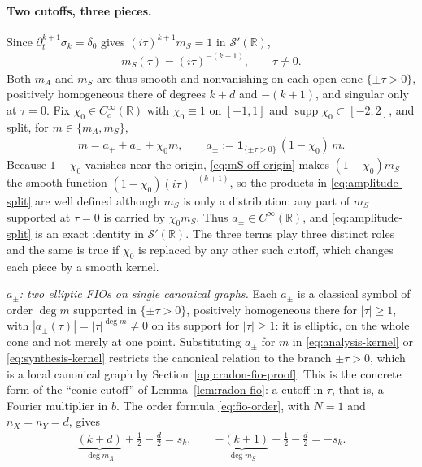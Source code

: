 \documentclass[12pt]{article}
\numberwithin{equation}{section}
\numberwithin{figure}{section}
\numberwithin{equation}{section}
\newcommand{\R}{\mathbb{R}}
\newcommand{\abs}[1]{\left|#1\right|}
\DeclareMathOperator{\supp}{supp}
\begin{document}
\paragraph{Two cutoffs, three pieces.}
Since $\partial_t^{k+1}\sigma_k=\delta_0$ gives $(i\tau)^{k+1}m_S=1$ in
$\mathcal S'(\R)$,
\begin{align}
    m_S(\tau)=(i\tau)^{-(k+1)},
    \qquad \tau\neq0 .
    \label{eq:mS-off-origin}
\end{align}
Both $m_A$ and $m_S$ are thus smooth and nonvanishing on each open cone
$\{\pm\tau>0\}$, positively homogeneous there of degrees $k+d$ and $-(k+1)$, and
singular only at $\tau=0$.  Fix $\chi_0\in C_c^\infty(\R)$ with $\chi_0\equiv1$ on
$[-1,1]$ and $\supp\chi_0\subset[-2,2]$, and split, for $m\in\{m_A,m_S\}$,
\begin{align}
    m=a_++a_-+\chi_0m,
    \qquad
    a_\pm:=\mathbf 1_{\{\pm\tau>0\}}\,(1-\chi_0)\,m .
    \label{eq:amplitude-split}
\end{align}
Because $1-\chi_0$ vanishes near the origin, \eqref{eq:mS-off-origin} makes
$(1-\chi_0)m_S$ the smooth function $(1-\chi_0)(i\tau)^{-(k+1)}$, so the products in
\eqref{eq:amplitude-split} are well defined although $m_S$ is only a distribution: any
part of $m_S$ supported at $\tau=0$ is carried by $\chi_0m_S$.  Thus
$a_\pm\in C^\infty(\R)$, and \eqref{eq:amplitude-split} is an exact identity in
$\mathcal S'(\R)$.  The three terms play three distinct roles and the same is true if 
$\chi_0$ is replaced by any other such cutoff, which changes each piece by a smooth kernel.

\emph{$a_\pm$: two elliptic FIOs on single canonical graphs.}  Each $a_\pm$ is a
classical symbol of order $\deg m$ supported in $\{\pm\tau>0\}$, positively homogeneous
there for $\abs\tau\ge1$, with $\abs{a_\pm(\tau)}=\abs{\tau}^{\deg m}\neq0$ on its
support for $\abs\tau\ge1$: it is elliptic, on the whole cone and not merely at one
point.  Substituting $a_\pm$ for $m$ in \eqref{eq:analysis-kernel} or
\eqref{eq:synthesis-kernel} restricts the canonical relation to the branch
$\pm\tau>0$, which is a local canonical graph by Section~\ref{app:radon-fio-proof}.
This is the concrete form of the ``conic cutoff'' of Lemma~\ref{lem:radon-fio}: a
cutoff in $\tau$, that is, a Fourier multiplier in $b$.  The order formula
\eqref{eq:fio-order}, with $N=1$ and $n_X=n_Y=d$, gives
\begin{align*}
    \underbrace{(k+d)}_{\deg m_A}+\tfrac12-\tfrac d2=s_k,
    \qquad
    \underbrace{-(k+1)}_{\deg m_S}+\tfrac12-\tfrac d2=-s_k .
\end{align*}
\end{document}

